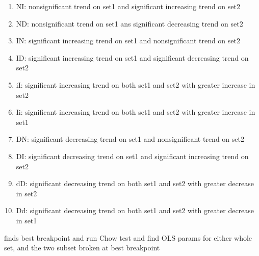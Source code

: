 \documentclass[letterpaper,10pt,english]{sphinxmanual}
\begin{document}
\begin{fulllineitems}
\begin{fulllineitems}
\begin{enumerate}
\item {} 
\sphinxAtStartPar
NI: non\sphinxhyphen{}significant trend on set1 and significant increasing trend on set2

\item {} 
\sphinxAtStartPar
ND: non\sphinxhyphen{}significant trend on set1 ans significant decreasing trend on set2

\item {} 
\sphinxAtStartPar
IN: significant increasing trend on set1 and non\sphinxhyphen{}significant trend on set2

\item {} 
\sphinxAtStartPar
ID: significant increasing trend on set1 and significant decreasing trend on set2

\item {} 
\sphinxAtStartPar
iI: significant increasing trend on both set1 and set2 with greater increase in set2

\item {} 
\sphinxAtStartPar
Ii: significant increasing trend on both set1 and set2 with greater increase in set1

\item {} 
\sphinxAtStartPar
DN: significant decreasing trend on set1 and non\sphinxhyphen{}significant trend on set2

\item {} 
\sphinxAtStartPar
DI: significant decreasing trend on set1 and significant increasing trend on set2

\item {} 
\sphinxAtStartPar
dD: significant decreasing trend on both set1 and set2 with greater decrease in set2

\item {} 
\sphinxAtStartPar
Dd: significant decreasing trend on both set1 and set2 with greater decrease in set1

\end{enumerate}

\end{fulllineitems}


\begin{fulllineitems}
\label{\detokenize{source/chowclassifier:chowclassifier.chow.Chow.find_best_bkp}}
\pysigstartsignatures
{}
\pysigstopsignatures
\sphinxAtStartPar
finds best breakpoint and run Chow test and find OLS params for either whole set,
and the two subset broken at best breakpoint


\end{fulllineitems}
\end{fulllineitems}
\end{document}
